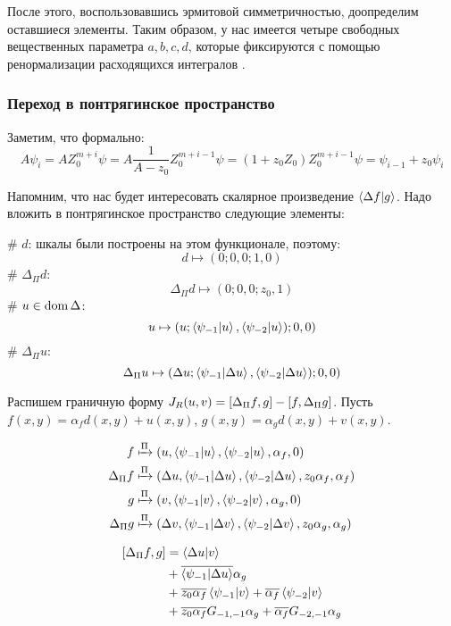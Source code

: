 После этого, воспользовавшись эрмитовой симметричностью, доопределим оставшиеся элементы. Таким образом, у нас имеется четыре свободных вещественных параметра $a, b, c, d$, которые фиксируются с помощью ренормализации расходящихся интегралов \cite{berezin1963models}.

\subsubsection{Переход в понтрягинское пространство}

Заметим, что формально:
\[
A \psi_i = A Z_0^{m + i} \psi = A \frac{1}{A - z_0} Z_0^{m + i - 1} \psi = (1 + z_0 Z_0) Z_0^{m + i - 1} \psi = \psi_{i - 1} + z_0 \psi_i
\]

Напомним, что нас будет интересовать скалярное произведение $\ip{\Delta f}{g}$. Надо вложить в понтрягинское пространство следующие элементы:
\begin{ilist}
# $d$: шкалы были построены на этом функционале, поэтому:
\[
d \mapsto (0; 0, 0; 1, 0)
\]
# $\Delta_\Pi d$:
\[
\Delta_\Pi d \mapsto (0; 0, 0; z_0, 1)
\]
# $u \in \operatorname{dom} \Delta$:
\[
u \mapsto (u; \ip{\psi_{-1}}{u}, \ip{\psi_{-2}}{u}); 0, 0)
\]
# $\Delta_\Pi u$:
\[
\Delta_\Pi u \mapsto (\Delta u; \ip{\psi_{-1}}{\Delta u}, \ip{\psi_{-2}}{\Delta u}); 0, 0)
\]
\end{ilist}
 
Распишем граничную форму $J_R(u, v) = [\Delta_\Pi f,g] - [f,\Delta_\Pi g]$. Пусть $f(x, y) = \alpha_f d(x, y) + u(x, y)$, $g(x, y) = \alpha_g d(x, y) + v(x, y)$.

\begin{align*}
f            & \xmapsto[]{\Pi} \Vector{u, \ip{\psi_{-1}}{u}, \ip{\psi_{-2}}{u}, \alpha_f, 0} \\
\Delta_\Pi f & \xmapsto[]{\Pi} \Vector{\Delta u, \ip{\psi_{-1}}{\Delta u}, \ip{\psi_{-2}}{\Delta u}, z_0 \alpha_f, \alpha_f} \\
g            & \xmapsto[]{\Pi} \Vector{v, \ip{\psi_{-1}}{v}, \ip{\psi_{-2}}{v}, \alpha_g, 0} \\
\Delta_\Pi g & \xmapsto[]{\Pi} \Vector{\Delta v, \ip{\psi_{-1}}{\Delta v}, \ip{\psi_{-2}}{\Delta v}, z_0 \alpha_g, \alpha_g}
\end{align*}

\begin{align*}
\iip{\Delta_\Pi f}{g}
&= \ip{\Delta u}{v} \\
&+ \cconj{\ip{\psi_{-1}}{\Delta u}} \alpha_g \\
&+ \cconj{z_0 \alpha_f} \ip{\psi_{-1}}{v} + \cconj{\alpha_f} \ip{\psi_{-2}}{v} \\
&+ \cconj{z_0 \alpha_f} G_{-1, -1} \alpha_g + \cconj{\alpha_f} G_{-2, -1} \alpha_g 
\end{align*}

